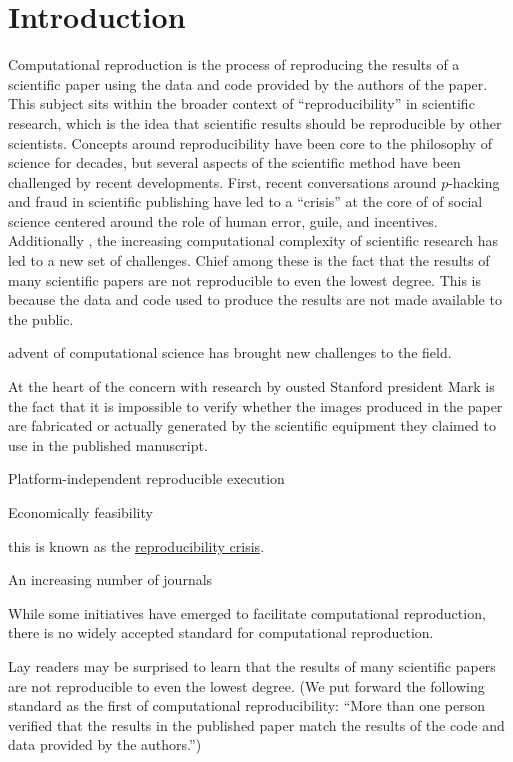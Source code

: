 
\hypertarget{introduction}{%
\section{Introduction}\label{introduction}}

Computational reproduction is the process of reproducing the results of a scientific paper using the data and code provided by the authors of the paper. This subject sits within the broader context of ``reproducibility'' in scientific  research, which is the idea that scientific results should be reproducible by other scientists. Concepts around reproducibility have been core to the philosophy of science for decades, but several aspects of the scientific method have been challenged by recent developments. 
First, recent conversations around $p$-hacking and fraud in scientific publishing have led to a ``crisis'' at the core of of social science centered around the role of human error, guile, and incentives. 
Additionally , the increasing computational complexity of scientific research has led to a new set of challenges. Chief among these is the fact that the results of many scientific papers are not reproducible to even the lowest degree. This is because the data and code used to produce the results are not made available to the public.

advent of computational science has brought new challenges to the field.

At the heart of the concern with research by ousted Stanford president Mark is the fact that it is impossible to verify whether the images produced in the paper are fabricated or actually generated by the scientific equipment they claimed to use in the published manuscript.

Platform-independent reproducible execution

Economically feasibility

this is known as the \href{https://en.wikipedia.org/wiki/Replication_crisis}{reproducibility crisis}.

An increasing number of journals 

While some initiatives have emerged to facilitate computational reproduction, there is no widely accepted standard for computational reproduction. 

Lay readers may be surprised to learn that the results of many scientific papers are not reproducible to even the lowest degree. (We put forward the following standard as the first of computational reproducibility: ``More than one person verified that the results in the published paper match the results of the code and data provided by the authors.'') 

